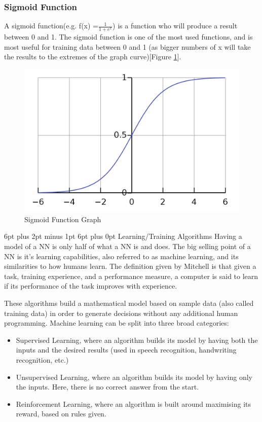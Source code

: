 \documentclass[12pt,a4paper]{article}
\makeatletter
\renewcommand\subsection{\@startsection {subsection}{1}{2mm} %
                               {6pt plus 2pt minus 1pt} %
                               {6pt plus 0pt} %
                               {\normalfont\bfseries}}
\makeatother
\begin{document}
\subsubsection{Sigmoid Function}
A sigmoid function(e.g. f(x) =\( \frac{1}{1+e^x} \)) is a function who will produce a result between 0 and 1. The sigmoid function is one of the most used functions, and is most useful for training data between 0 and 1 (as bigger numbers of x will take the results to the extremes of the graph curve)[Figure \ref{fig:3}].
\begin{figure}[ht]
	\includegraphics[width=\textwidth]{sigmoid}
	\centering
	\caption{Sigmoid Function Graph \protect \cite{nikhil_ketkar_deep_2017}}
	\label{fig:3}
\end{figure}

\subsection{Learning/Training Algorithms}
Having a model of a NN is only half of what a NN is and does. The big selling point of a NN is it’s learning capabilities, also referred to as machine learning, and its similarities to how humans learn. The definition given by Mitchell \cite{mitchell_explanation-based_1993} is that given a task, training experience, and a performance measure, a computer is said to learn if its performance of the task improves with experience.\cite{thrun_learning_2012}\par
These algorithms build a mathematical model based on sample data (also called training data) in order to generate decisions without any additional human programming. Machine learning can be split into three broad categories:
\begin{itemize}
	\item Supervised Learning, where an algorithm builds its model by having both the inputs and the desired results (used in speech recognition, handwriting recognition, etc.)
	\item Unsupervised Learning, where an algorithm builds its model by having only the inputs. Here, there is no correct answer from the start.
	\item Reinforcement Learning, where an algorithm is built around maximising its reward, based on rules given.
\end{itemize}
\end{document}
